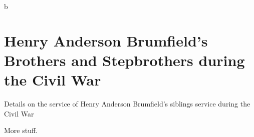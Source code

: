 b
\chapter{Henry Anderson Brumfield's Brothers and Stepbrothers during the Civil War}

Details on the service of Henry Anderson Brumfield's siblings service during the Civil War

More stuff.
